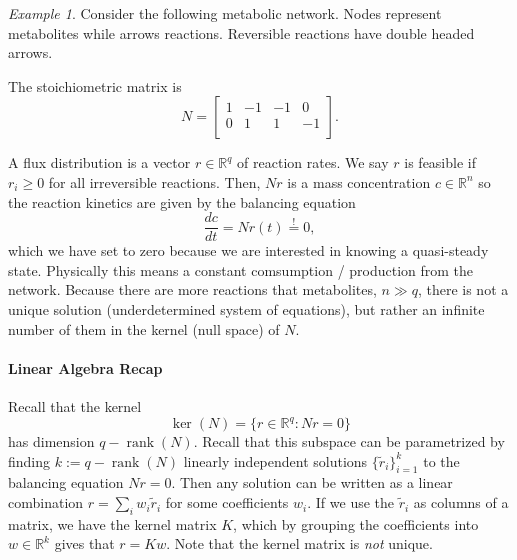 \documentclass[a4paper]{article}
\DeclareMathOperator{\rank}{rank}
\theoremstyle{plain}
\theoremstyle{definition}
\theoremstyle{remark}
\newtheorem*{example}{Example}
\begin{document}
\begin{example} Consider the following metabolic network. Nodes represent
  metabolites while arrows reactions. Reversible reactions have double headed
  arrows.
  \begin{center}
  \end{center}
  The stoichiometric matrix is
  \[
    N = \begin{bmatrix}
      1 & -1 & -1 &  0 \\
      0 &  1 &  1 & -1 \\
    \end{bmatrix}.
  \]
\end{example}

A flux distribution is a vector $r \in \mathbb{R}^q$ of reaction rates. We say
$r$ is feasible if $r_i \geq 0$ for all irreversible reactions. Then, $Nr$ is
a mass concentration $c \in \mathbb{R}^n$ so the reaction kinetics are given
by the balancing equation
\[
  \frac{dc}{dt} = N r(t) \stackrel{!}{=} 0,
\]
which we have set to zero because we are interested in knowing a quasi-steady
state. Physically this means a constant comsumption / production from the
network. Because there are more reactions that metabolites, $n \gg q$, there
is not a unique solution (underdetermined system of equations), but rather an
infinite number of them in the kernel (null space) of $N$. 

\paragraph{Linear Algebra Recap} Recall that the kernel
\[
  \ker(N) = \{ r \in \mathbb{R}^q : Nr = 0 \}
\]
has dimension $q - \rank(N)$. Recall that this subspace can be parametrized by
finding $k := q - \rank(N)$ linearly independent solutions
$\{\tilde{r}_i\}_{i=1}^k$ to the balancing equation $Nr = 0$. Then any
solution can be written as a linear combination $r = \sum_i w_i \tilde{r}_i$
for some coefficients $w_i$. If we use the $\tilde{r}_i$ as columns of a
matrix, we have the kernel matrix $K$, which by grouping the coefficients into
$w \in \mathbb{R}^k$ gives that $r = Kw$. Note that the kernel matrix is
\emph{not} unique.
\end{document}
